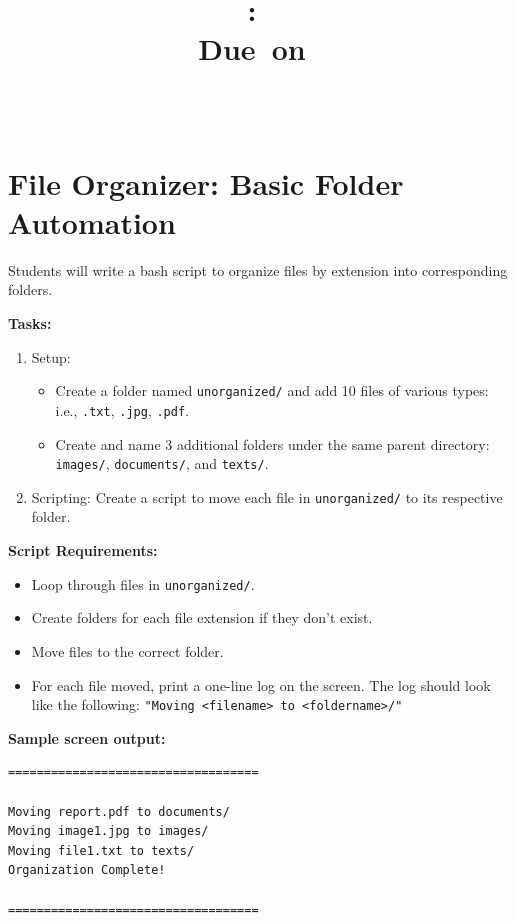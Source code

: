 \documentclass{article}
\title{
    \vspace{2in}
    \textmd{\textbf{\hmwkClass:\ \hmwkTitle}}\\
    \normalsize\vspace{0.1in}\small{Due\ on\ \hmwkDueDate}\\
    \vspace{0.1in}\large{\textit{\hmwkClassInstructor\ \hmwkClassTime}}
    \vspace{3in}
}
\author{\hmwkAuthorName}
\date{}
\theoremstyle{remark}
\begin{document}
\maketitle
\newpage

\section*{File Organizer: Basic Folder Automation}

Students will write a bash script to organize files by extension into corresponding folders.

\medskip

\textbf{Tasks:}

\begin{enumerate}
    \item Setup:
    \begin{itemize}
        \item Create a folder named \texttt{unorganized/} and add 10 files of various types: i.e., \texttt{.txt}, \texttt{.jpg}, \texttt{.pdf}.
        \item Create and name 3 additional folders under the same parent directory: \texttt{images/}, \texttt{documents/}, and \texttt{texts/}.
    \end{itemize}

    \item Scripting: Create a script to move each file in \texttt{unorganized/} to its respective folder.
\end{enumerate}

\medskip

\textbf{Script Requirements:}

\begin{itemize}
    \item Loop through files in \texttt{unorganized/}.
    \item Create folders for each file extension if they don’t exist.
    \item Move files to the correct folder.
    \item For each file moved, print a one-line log on the screen. The log should look like the following:  
    \texttt{"Moving <filename> to <foldername>/"}
\end{itemize}

\medskip

\textbf{Sample screen output:}

\begin{verbatim}
===================================

Moving report.pdf to documents/
Moving image1.jpg to images/
Moving file1.txt to texts/
Organization Complete!

===================================
\end{verbatim}
\end{document}
